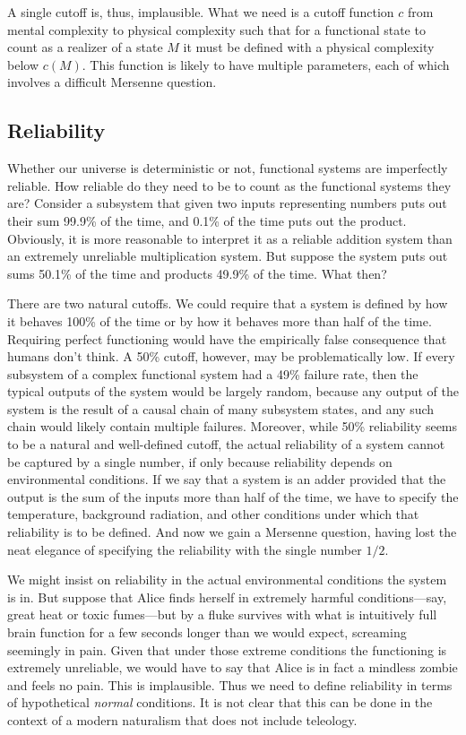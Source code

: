 A single cutoff is, thus, implausible. What we need is a cutoff function $c$ from mental complexity to physical
complexity such that for a functional state to count as a realizer of a state $M$ it must be defined with a 
physical complexity below $c(M)$. This function is likely to have multiple parameters, each of which involves
a difficult Mersenne question. 

\subsection{Reliability}
Whether our universe is deterministic or not, functional systems are imperfectly reliable.
How reliable do they need to be to count as the functional systems they are? Consider a subsystem that given two inputs representing numbers
puts out their sum 99.9\% of the time, and 0.1\% of the time puts out the product. Obviously, it is more reasonable to interpret it as 
a reliable addition system than an extremely unreliable multiplication system. But suppose the system puts out sums 50.1\% of the time
and products 49.9\% of the time. What then? 

There are two natural cutoffs. We could require that a system is defined by how it behaves 100\% of the time or by how it behaves
more than half of the time. Requiring perfect functioning would have the empirically false consequence that humans don't think. 
A 50\% cutoff, however, may be problematically low. If every subsystem of a complex functional system had a 49\% failure rate, then 
the typical outputs of the system would be largely random, because any output of the system is the result of a causal chain of many 
subsystem states, and any such chain would likely contain multiple failures. Moreover, while 50\% reliability seems to be a natural
and well-defined cutoff, the actual reliability of a system cannot be captured by a single number, if only because reliability
depends on environmental conditions. If we say that a system is an adder provided that the output is the sum of the inputs more
than half of the time, we have to specify the temperature, background radiation, and other conditions under which that reliability
is to be defined. And now we gain a Mersenne question, having lost the neat elegance of specifying the reliability with the single number $1/2$.

We might insist on reliability in the actual environmental conditions the system is in. But suppose that
Alice finds herself in extremely harmful conditions---say, great heat or toxic fumes---but by a fluke survives with what is intuitively
full brain function for a few seconds longer than we would expect, screaming seemingly in pain. Given that under those extreme conditions
the functioning is extremely unreliable, we would have to say that Alice is in fact a mindless zombie and feels no pain. This is
implausible. Thus we need to define reliability in terms of hypothetical \textit{normal} conditions. It is not clear
that this can be done in the context of a modern naturalism that does not include teleology.

